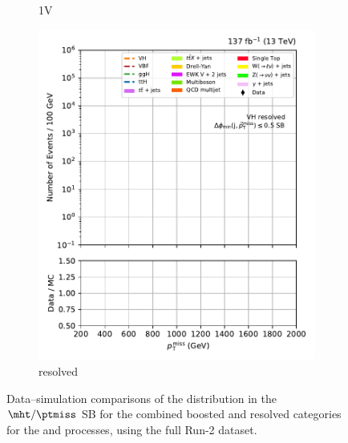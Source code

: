 \begin{figure}[htbp]
\begin{subfigure}[b]{0.24\textwidth}
        \caption{\VH 1V}
    \end{subfigure}
    \hfill
    \begin{subfigure}[b]{0.24\textwidth}
        \includegraphics[width=\textwidth]{figures/region_plots/full_Run2/sideband_2/VH_resolved.pdf}
        \caption{\VH resolved}
    \end{subfigure}
    \caption[Data--simulation comparisons of the \ptmiss distribution in the $\mht/\ptmiss$ sideband for the combined boosted and resolved categories for the \ttH and \VH processes, using the full Run-2 dataset]{Data--simulation comparisons of the \ptmiss distribution in the $\mht/\ptmiss$ \gls{SB} for the combined boosted and resolved categories for the \ttH and \VH processes, using the full Run-2 dataset.}
    \label{fig:htoinv_sb_yields_comb2016to18_mht_met}
\end{figure}

